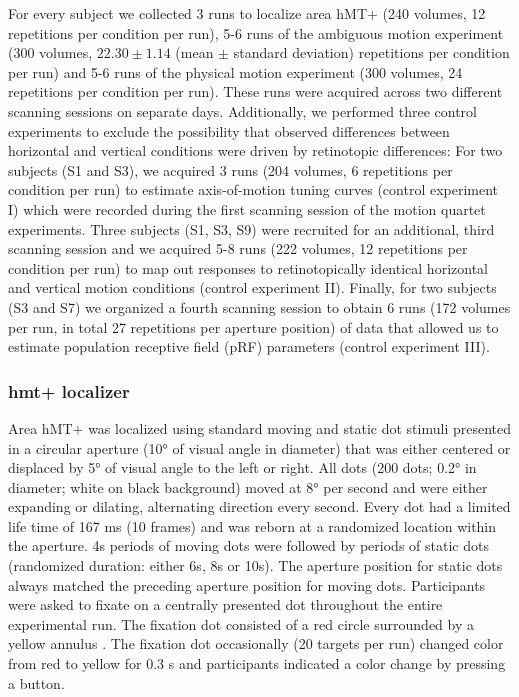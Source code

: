 For every subject we collected 3 runs to localize area hMT+ (240 volumes, 12 repetitions per condition per run), 5-6 runs of the ambiguous motion experiment (300 volumes, $ 22.30 \pm 1.14$ (mean $\pm$ standard deviation) repetitions per condition per run) and 5-6 runs of the physical motion experiment (300 volumes, 24 repetitions per condition per run). These runs were acquired across two different scanning sessions on separate days. Additionally, we performed three control experiments to exclude the possibility that observed differences between horizontal and vertical conditions were driven by retinotopic differences: For two subjects (S1 and S3), we acquired 3 runs (204 volumes, 6 repetitions per condition per run) to estimate axis-of-motion tuning curves (control experiment I) which were recorded during the first scanning session of the motion quartet experiments. Three subjects (S1, S3, S9) were recruited for an additional, third scanning session and we acquired 5-8 runs (222 volumes, 12 repetitions per condition per run) to map out responses to retinotopically identical horizontal and vertical motion conditions (control experiment II). Finally, for two subjects (S3 and S7) we organized a fourth scanning session to obtain 6 runs (172 volumes per run, in total 27 repetitions per aperture position) of data that allowed us to estimate population receptive field (pRF) parameters (control experiment III).

\subsubsection{hmt+ localizer}
Area hMT+ was localized using standard moving and static dot stimuli \parencite{Huk2002, Amano2009, Emmerling2016} presented in a circular aperture (10° of visual angle in diameter) that was either centered or displaced by 5° of visual angle to the left or right. All dots (200 dots; 0.2° in diameter; white on black background) moved at 8° per second and were either expanding or dilating, alternating direction every second. Every dot had a limited life time of 167 ms (10 frames) and was reborn at a randomized location within the aperture. 4s periods of moving dots were followed by periods of static dots (randomized duration: either 6s, 8s or 10s). The aperture position for static dots always matched the preceding aperture position for moving dots. Participants were asked to fixate on a centrally presented dot throughout the entire experimental run. The fixation dot consisted of a red circle surrounded by a yellow annulus \parencite{Marquardt2018}. The fixation dot occasionally (20 targets per run) changed color from red to yellow for 0.3 s and participants indicated a color change by pressing a button.

